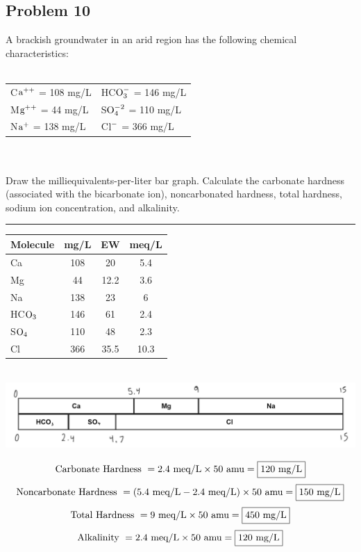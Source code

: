 \subsection*{Problem 10}
A brackish groundwater in an arid region has the following chemical characteristics:\\\\
\begin{tabular}{l l}
    C\(\textnormal{a}^{++}\) = 108 mg/L & HC\(\textnormal{O}_{3}^-\) = 146 mg/L \\
    M\(\textnormal{g}^{++}\) = 44 mg/L & S\(\textnormal{O}_{4}^{-2}\) = 110 mg/L \\
    N\(\textnormal{a}^{+}\) = 138 mg/L  &  C\(\textnormal{l}^{-}\) = 366 mg/L\\
\end{tabular}
\\\\
Draw the milliequivalents-per-liter bar graph. Calculate the carbonate hardness (associated with the bicarbonate ion), noncarbonated hardness, total hardness, sodium ion concentration, and alkalinity.
\\
\rule{5cm}{1pt}
\begin{center}
\begin{tabular}{l c c c}
    Molecule & mg/L & EW & meq/L\\
    \hline
    Ca & 108 & 20 & 5.4\\
    Mg & 44 & 12.2 & 3.6\\
    Na & 138 & 23 & 6\\
    HC\(\textnormal{O}_3\) & 146 & 61 & 2.4\\
    S\(\textnormal{O}_4\) & 110 & 48 & 2.3\\
    Cl & 366 & 35.5 & 10.3
\end{tabular}\\
\includegraphics[scale=0.33]{diagram2.png}
\end{center}
\[\textnormal{Carbonate Hardness }=2.4\textnormal{ meq/L}\times 50\textnormal{ amu}=\boxed{120 \textnormal{ mg/L}}\]
\[\textnormal{Noncarbonate Hardness }=(5.4\textnormal{ meq/L}-2.4\textnormal{ meq/L})\times 50\textnormal{ amu}=\boxed{150 \textnormal{ mg/L}}\]
\[\textnormal{Total Hardness }=9\textnormal{ meq/L}\times 50\textnormal{ amu}=\boxed{450 \textnormal{ mg/L}}\]
\[\textnormal{Alkalinity }=2.4\textnormal{ meq/L}\times 50\textnormal{ amu}=\boxed{120 \textnormal{ mg/L}}\]
\newpage
